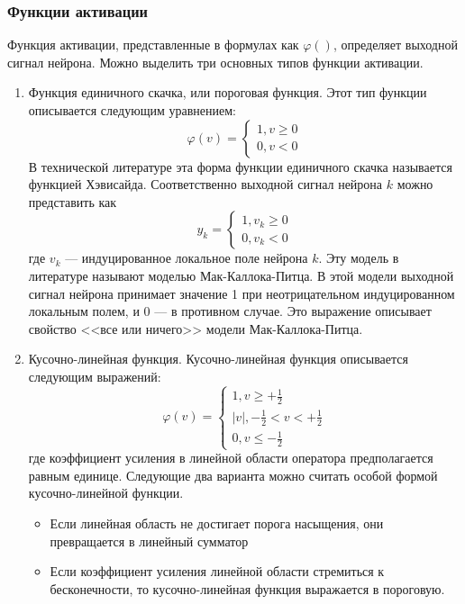 \subsubsection{Функции активации}
Функция активации, представленные в формулах как $\varphi()$, определяет выходной сигнал нейрона.
Можно выделить три основных типов функции активации.
\begin{enumerate}
\item Функция единичного скачка, или пороговая функция.
Этот тип функции описывается следующим уравнением:
\begin{equation}
\varphi(v) = 
\begin{cases}
1, v \ge 0\\
0, v < 0
\end{cases}
\end{equation}
В технической литературе эта форма функции единичного скачка называется функцией Хэвисайда.
Соответственно выходной сигнал нейрона $k$ можно представить как
\begin{equation}
y_k = 
\begin{cases}
1, v_k \ge 0\\
0, v_k < 0
\end{cases}
\end{equation}
где $v_k$ --- индуцированное локальное поле нейрона $k$.
Эту модель в литературе называют моделью Мак-Каллока-Питца. В этой модели выходной сигнал нейрона принимает значение 1 при неотрицательном индуцированном локальным полем, и 0 --- в противном случае.
Это выражение описывает свойство <<все или ничего>> модели Мак-Каллока-Питца.
\item Кусочно-линейная функция. Кусочно-линейная функция описывается следующим выражений:
\begin{equation}
\varphi(v) = 
\begin{cases}
1, v \ge +\frac12\\
|v|, -\frac12<v<+\frac12\\
0, v \le -\frac12
\end{cases}
\end{equation}
где коэффициент усиления в линейной области оператора предполагается равным единице.
Следующие два варианта можно считать особой формой кусочно-линейной функции.
\begin{itemize}
\item Если линейная область не достигает порога насыщения, они превращается в линейный сумматор 
\item Если коэффициент усиления линейной области стремиться к бесконечности, то кусочно-линейная функция выражается в пороговую.

\end{itemize}
\end{enumerate}
